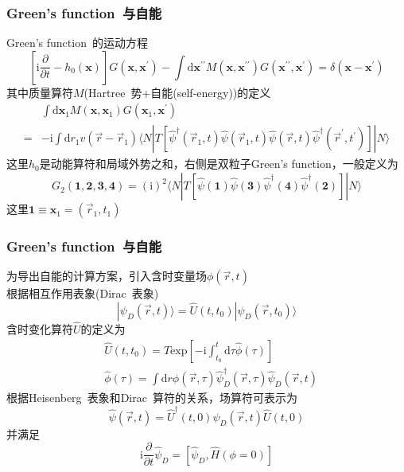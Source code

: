 \documentclass[cjk,slidestop,compress,mathserif,blue]{beamer}
\begin{document}
\frame
{
	\frametitle{\textrm{Green's function~}与自能}
	\textrm{Green's function~}的运动方程
	\begin{displaymath}
		\left[ \mathrm{i}\frac{\partial}{\partial t}-h_0(\mathbf{x}) \right]G(\mathbf{x},\mathbf{x}^{\prime})-\int\mathrm{d}\mathbf{x}^{\prime\prime}M(\mathbf{x},\mathbf{x}^{\prime\prime})G(\mathbf{x}^{\prime\prime},\mathbf{x}^{\prime})=\delta(\mathbf{x}-\mathbf{x}^{\prime})
	\end{displaymath}
	其中质量算符$M$(\textrm{Hartree~}势+自能(\textrm{self-energy}))的定义
	\begin{displaymath}
		\begin{aligned}
			&\int\mathrm{d}\mathbf{x}_1M(\mathbf{x},\mathbf{x}_1)G(\mathbf{x}_1,\mathbf{x}^{\prime})\\
			=&-\mathrm{i}\int\mathrm{d}r_1v(\vec r-\vec r_1)\langle N|T[\hat{\psi}^{\dag}(\vec r_1,t)\hat{\psi}(\vec r_1,t)\hat{\psi}(\vec r,t)\hat{\psi}^{\dag}(\vec r^{\prime},t^{\prime})]|N\rangle
		\end{aligned}
	\end{displaymath}
	这里$h_0$是动能算符和局域外势之和，右侧是双粒子\textrm{Green's function}，一般定义为
	\begin{displaymath}
		G_2(\mathbf{1},\mathbf{2},\mathbf{3},\mathbf{4})=(\mathrm{i})^2\langle N|T[\hat{\psi}(\mathbf{1})\hat{\psi}(\mathbf{3})\hat{\psi}^{\dag}(\mathbf{4})\hat{\psi}^{\dag}(\mathbf{2})]|N\rangle
	\end{displaymath}
	这里$\mathbf{1}\equiv\mathbf{x}_1=(\vec r_1,t_1)$
}

\frame
{
	\frametitle{\textrm{Green's function~}与自能}
	为导出自能的计算方案，引入含时变量场$\phi(\vec r,t)$\\根据相互作用表象(\textrm{Dirac~}表象)
	\begin{displaymath}
		|\psi_D(\vec r,t)\rangle=\hat{U}(t,t_0)|\psi_D(\vec r,t_0)\rangle
	\end{displaymath}
	含时变化算符$\hat U$的定义为
	\begin{displaymath}
		\begin{aligned}
			&\hat U(t,t_0)=T\mathrm{exp}\left[ -\mathrm{i}\int_{t_0}^t\mathrm{d}\tau\hat{\phi}(\tau) \right]\\
			&\hat{\phi}(\tau)=\int\mathrm{d}r\phi(\vec r,\tau)\hat{\psi}_D^{\dag}(\vec r,\tau)\hat{\psi}_D(\vec r,t)
		\end{aligned}
	\end{displaymath}
	根据\textrm{Heisenberg~}表象和\textrm{Dirac~}算符的关系，场算符可表示为
	\begin{displaymath}
		\hat{\psi}(\vec r,t)=\hat{U}^{\dag}(t,0)\hat{\psi}_D(\vec r,t)\hat{U}(t,0)
	\end{displaymath}
	并满足
	\begin{displaymath}
		\mathrm{i}\frac{\partial}{\partial t}\hat{\psi}_D=[\hat{\psi}_D,\hat{H}(\phi=0)]
	\end{displaymath}
}
\end{document}
